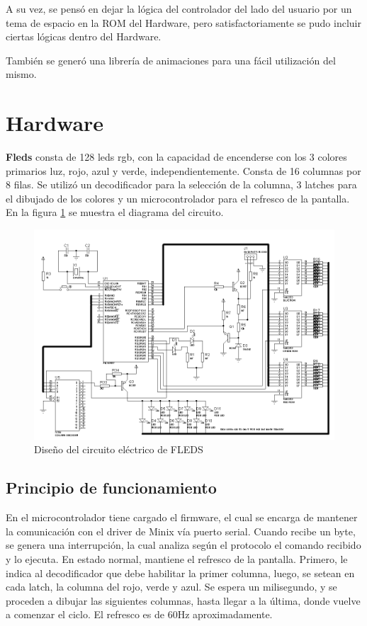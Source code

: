 \documentclass[a4paper,11pt,epsf]{article}
\begin{document}
A su vez, se pens\'o en dejar la l\'ogica del controlador del lado del usuario por un tema de espacio en la ROM del Hardware, pero satisfactoriamente se pudo incluir ciertas l\'ogicas dentro del Hardware. 

Tambi\'en se gener\'o una librer\'ia de animaciones para una f\'acil utilizaci\'on del mismo. 

\section{Hardware}
\textbf{Fleds} consta de 128 leds rgb, con la capacidad de encenderse con los 3 colores primarios luz, rojo, azul y verde, independientemente.  Consta de 16 columnas por 8 filas. Se utiliz\'o un decodificador para la selecci\'on de la columna, 3 latches para el dibujado de los colores y un microcontrolador para el refresco de la pantalla.  En la figura \ref{design} se muestra el diagrama del circuito.

\begin{figure}
\centering
\includegraphics[scale =0.5]{design.png}
\caption{Dise\~no del circuito el\'ectrico de FLEDS}\label{design}
\end{figure}

\subsection{Principio de funcionamiento}
En el microcontrolador tiene cargado el firmware, el cual se encarga de mantener la comunicaci\'on con el driver de Minix v\'ia puerto serial. 
Cuando recibe un byte, se genera una interrupci\'on, la cual analiza seg\'un el protocolo el comando recibido y lo ejecuta. 
En estado normal, mantiene el refresco de la pantalla. Primero, le indica al decodificador que debe habilitar la primer columna, luego, se setean en cada latch, la columna del rojo, verde y azul. Se espera un milisegundo, y se proceden a dibujar las siguientes columnas, hasta llegar a la \'ultima, donde vuelve a comenzar el ciclo. El refresco es de 60Hz aproximadamente.
\end{document}
